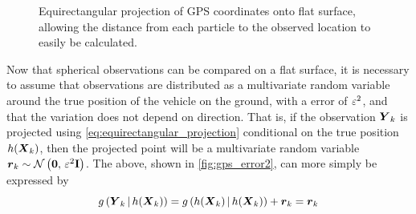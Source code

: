 \begin{knitrout}
\color{fgcolor}\begin{figure}

{\centering {}

}

\caption[Equirectangular projection of GPS coordinates onto flat surface, allowing the distance from each particle to the observed location to easily be calculated]{Equirectangular projection of GPS coordinates onto flat surface, allowing the distance from each particle to the observed location to easily be calculated.}\label{fig:gps_projection}
\end{figure}


\end{knitrout}


Now that spherical observations can be compared on a flat surface,
it is necessary to assume that \GPS{} observations are distributed
as a multivariate random variable around the true position of the vehicle
on the ground,
with a \GPS{} error of $\varepsilon^2$,
and that the variation does not depend on direction.
That is, if the observation $\boldsymbol{Y}_k$ is projected using
\cref{eq:equirectangular_projection} conditional on the true position
$h(\boldsymbol{X}_k)$,
then the projected point will be a multivariate random variable
$\boldsymbol{r}_k \sim \mathcal{N}\left(\boldsymbol{0},\, \varepsilon^2 \mathbf{I}\right)$.
The above, shown in \cref{fig:gps_error2},
can more simply be expressed by
\begin{equation}
\label{eq:gps_error_model}
g\left(\boldsymbol{Y}_k\,|\,h(\boldsymbol{X}_k)\right) =
    g\left(h(\boldsymbol{X}_k)\,|\,h(\boldsymbol{X}_k)\right) + \boldsymbol{r}_k
    = \boldsymbol{r}_k
\end{equation}

